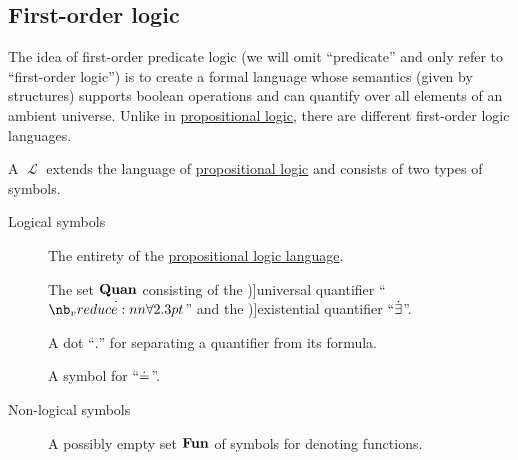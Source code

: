 \subsection{First-order logic}\label{subsec:first_order_logic}

The idea of first-order predicate logic (we will omit \enquote{predicate} and only refer to \enquote{first-order logic}) is to create a formal language whose semantics (given by structures) supports boolean operations and can quantify over all elements of an ambient universe. Unlike in \hyperref[subsec:propositional_logic]{propositional logic}, there are different first-order logic languages.

\begin{definition}\label{def:first_order_language}
  A  \( \mscrL \) extends the language of \hyperref[subsec:propositional_logic]{propositional logic} and consists of two types of symbols.

  \begin{description}
    \item[Logical symbols]
    \hfill
    \begin{thmenum}[series=def:first_order_language]
       The entirety of the \hyperref[subsec:propositional_logic]{propositional logic language}.

       The set \( \op*{Quan} \) consisting of the \term[ru=квантор общости (\cite[61]{Эдельман1975Логика})]{universal quantifier} \enquote{\( \synforall \)} and the \term[ru=квантор существования (\cite[61]{Эдельман1975Логика})]{existential quantifier} \enquote{\( \dot\exists \)}.

       A dot \enquote{\( . \)} for separating a quantifier from its formula.

       A symbol for  \enquote{\( \doteq \)}.
    \end{thmenum}

    \item[Non-logical symbols]
    \hfill
    \begin{thmenum}[resume=def:first_order_language]
       A possibly empty  set \( \op*{Fun} \) of symbols for denoting functions.


\end{thmenum}
\end{description}
\end{definition}
